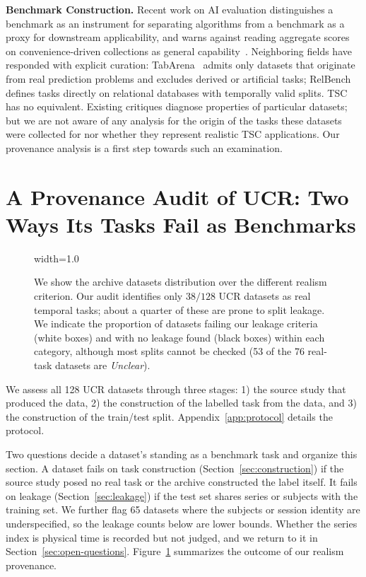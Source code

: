 \documentclass{article}
\begin{document}
\textbf{Benchmark Construction.}
Recent work on AI evaluation distinguishes a benchmark as an instrument for separating algorithms from a benchmark as a proxy for downstream applicability, and warns against reading aggregate scores on convenience-driven collections as general capability~\citep{raji2021everything}. Neighboring fields have responded with explicit curation: TabArena~\citep{erickson2025tabarena} admits only datasets that originate from real prediction problems and excludes derived or artificial tasks; RelBench~\citep{robinson2024relbench} defines tasks directly on relational databases with temporally valid splits. TSC has no equivalent. Existing critiques diagnose properties of particular datasets; but we are not aware of any analysis for the origin of the tasks these datasets were collected for nor whether they represent realistic TSC applications. Our provenance analysis is a first step towards such an examination.

\section{A Provenance Audit of UCR: Two Ways Its Tasks Fail as Benchmarks} \label{sec:audit}

\begin{figure}[!t]
  \centering
    \begin{adjustbox}{width=1.0\columnwidth}
    
  \end{adjustbox}
  \vspace{-16pt}
  \caption{We show the archive datasets distribution over the different realism criterion. Our audit identifies only $38/128$ UCR datasets as real temporal tasks; about a quarter of these are prone to split leakage. We indicate the proportion of datasets failing our leakage criteria (white boxes) and with no leakage found (black boxes) within each category, although most splits cannot be checked (53 of the 76 real-task datasets are \emph{Unclear}).}
  \label{fig:composition}
  \vspace{-9pt}
\end{figure}


We assess all 128 UCR datasets through three stages: 1) the source study that produced the data, 2) the construction of the labelled task from the data, and 3) the construction of the train/test split. Appendix~\ref{app:protocol} details the protocol.

Two questions decide a dataset's standing as a benchmark task and organize this section. A dataset fails on task construction (Section~\ref{sec:construction}) if the source study posed no real task or the archive constructed the label itself. It fails on leakage (Section~\ref{sec:leakage}) if the test set shares series or subjects with the training set. We further flag 65 datasets where the subjects or session identity are underspecified, so the leakage counts below are lower bounds. Whether the series index is physical time is recorded but not judged, and we return to it in Section~\ref{sec:open-questions}. Figure~\ref{fig:composition} summarizes the outcome of our realism provenance.
\end{document}
